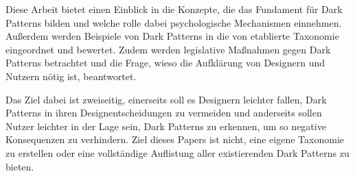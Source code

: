 \documentclass[conference,compsoc,final,a4paper]{IEEEtran}
\begin{document}
Diese Arbeit bietet einen Einblick in die Konzepte, die das Fundament für Dark Patterns bilden und welche rolle dabei psychologische Mechanismen einnehmen. Außerdem werden Beispiele von Dark Patterns in die von \citeauthor{Gray_2018} \autocite{Gray_2018} etablierte Taxonomie eingeordnet und bewertet. Zudem werden legislative Maßnahmen gegen Dark Patterns betrachtet und die Frage, wieso die Aufklärung von Designern und Nutzern nötig ist, beantwortet.


Das Ziel dabei ist zweiseitig, einerseits soll es Designern leichter fallen, Dark Patterns in ihren Designentscheidungen zu vermeiden und anderseits sollen Nutzer leichter in der Lage sein, Dark Patterns zu erkennen, um so negative Konsequenzen zu verhindern. Ziel dieses Papers ist nicht, eine eigene Taxonomie zu erstellen oder eine vollständige Auflistung aller existierenden Dark Patterns zu bieten.


\end{document}
